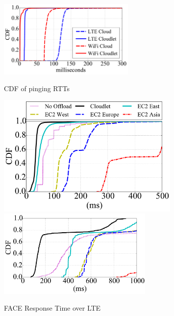 \begin{figure}
\begin{minipage}[c]{3in}
\begin{center}
\includegraphics[height=1.5in]{FIGS/ping_cdf.pdf}
\caption{CDF of pinging RTTs}
\label{fig:ping-CDF}
\end{center}
\end{minipage}
\begin{minipage}[c]{3.5in}
\begin{center}
    \hspace{0.2in}
    \includegraphics[width=0.8\textwidth,clip,trim=91pt 376pt 0 0]{FIGS/Legend-Wifi.pdf}
    \includegraphics[width=3in]{FIGS/Face-LTE.pdf}
\caption{FACE Response Time over LTE}
\label{fig:response-time-lte-face}
\end{center}
\end{minipage}
\end{figure}

